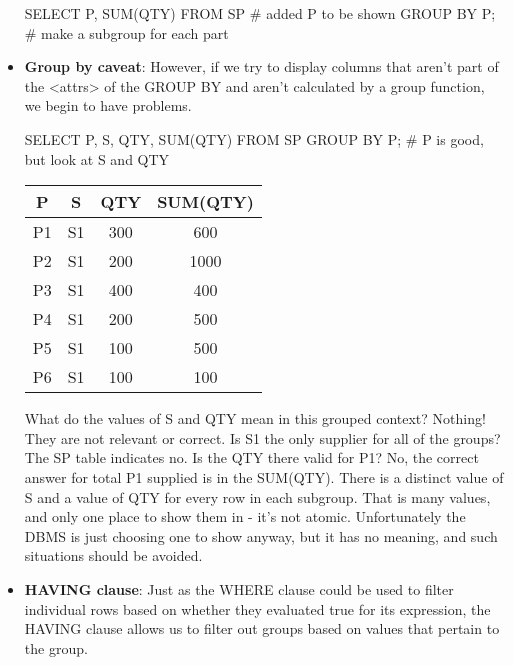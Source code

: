 \documentclass{report}
\begin{document}
\begin{itemize}
\begin{sqlcode}
            SELECT P, SUM(QTY) FROM SP # added P to be shown
                GROUP BY P; # make a subgroup for each part
            \end{sqlcode}
        \item \textbf{Group by caveat}: However, if we try to display columns that aren't part of the <attrs> of the GROUP BY and aren't calculated by a group function, we begin to have problems.
            \bigbreak \noindent 
            \begin{sqlcode}
            SELECT P, S, QTY, SUM(QTY) FROM SP GROUP BY P; # P is good, but look at S and QTY
            \end{sqlcode}
            \bigbreak \noindent 
            \begin{center}
                \begin{tabular}{c|c|c|c}
                    P &S &QTY &SUM(QTY) \\
                    \hline
                    P1 &S1 &300 &600 \\
                    P2 &S1 &200 &1000 \\
                    P3 &S1 &400 &400 \\
                    P4 &S1 &200 &500 \\
                    P5 &S1 &100 &500 \\
                    P6 &S1 &100 &100 
                \end{tabular}
            \end{center}
            \bigbreak \noindent 
            What do the values of S and QTY mean in this grouped context? Nothing! They are not relevant or correct. Is S1 the
            only supplier for all of the groups? The SP table indicates no. Is the QTY there valid for P1? No, the correct answer
            for total P1 supplied is in the SUM(QTY).
            \bigbreak \noindent 
            There is a distinct value of S and a value of QTY for every row in each subgroup. That is many values, and only one
            place to show them in - it's not atomic. Unfortunately the DBMS is just choosing one to show anyway, but it has no
            meaning, and such situations should be avoided.
        \item \textbf{HAVING clause}: Just as the WHERE clause could be used to filter individual rows based on whether they evaluated true for its expression, the HAVING clause allows us to filter out groups based on values that pertain to the group.
            \bigbreak \noindent 
            \begin{sqlcode}

\end{sqlcode}
\end{itemize}
\end{document}
